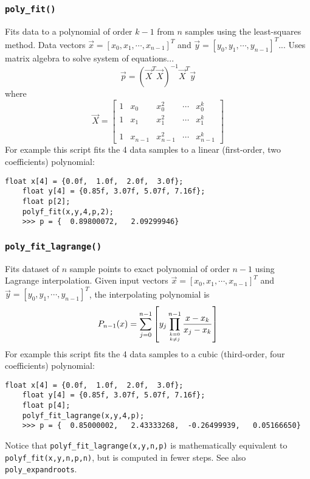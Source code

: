 \subsubsection{{\tt poly\_fit()}}
\label{module:math:poly:polyf_fit}
Fits data to a polynomial of order $k-1$ from $n$ samples using the
least-squares method.
Data vectors
$\vec{x}=[x_0,x_1,\cdots,x_{n-1}]^T$ and 
$\vec{y}=[y_0,y_1,\cdots,y_{n-1}]^T$...
Uses matrix algebra to solve system of equations...
%
\begin{equation}
\label{eqn:math:poly:syseq}
    \vec{p} = \left(\vec{X}^T\vec{X}\right)^{-1}\vec{X}^T\vec{y}
\end{equation}
%
where
%
\begin{equation}
\label{eqn:math:poly:polyfit}
    \vec{X} = 
    \begin{bmatrix}
        1   & x_0       & x_0^2     & \cdots    & x_0^{k}     \\
        1   & x_1       & x_1^2     & \cdots    & x_1^{k}     \\
        \\
        1   & x_{n-1}   & x_{n-1}^2 & \cdots    & x_{n-1}^{k}
    \end{bmatrix}
\end{equation}
%
For example this script fits the 4 data samples to a linear
(first-order, two coefficients) polynomial:
%
\begin{Verbatim}[fontsize=\small]
    float x[4] = {0.0f,  1.0f,  2.0f,  3.0f};
    float y[4] = {0.85f, 3.07f, 5.07f, 7.16f};
    float p[2];
    polyf_fit(x,y,4,p,2);
    >>> p = {  0.89800072,   2.09299946}
\end{Verbatim}


\subsubsection{{\tt poly\_fit\_lagrange()}}
\label{module:math:poly:polyf_fit_lagrange}
Fits dataset of $n$ sample points to exact polynomial of order $n-1$ using
Lagrange interpolation.
Given input vectors
$\vec{x}=[x_0,x_1,\cdots,x_{n-1}]^T$ and 
$\vec{y}=[y_0,y_1,\cdots,y_{n-1}]^T$, the interpolating polynomial is
%
\begin{equation}
\label{eqn:math:poly:polyfit_lagrange}
    P_{n-1}(x) =
        \sum_{j=0}^{n-1} {
            \left[
            y_j
            \prod_{{k=0}\atop{k \ne j}}^{n-1} {
                \frac{x-x_k}{x_j-x_k}
            }
            \right]
        }
\end{equation}
%
For example this script fits the 4 data samples to a cubic
(third-order, four coefficients) polynomial:
%
\begin{Verbatim}[fontsize=\small]
    float x[4] = {0.0f,  1.0f,  2.0f,  3.0f};
    float y[4] = {0.85f, 3.07f, 5.07f, 7.16f};
    float p[4];
    polyf_fit_lagrange(x,y,4,p);
    >>> p = {  0.85000002,   2.43333268,  -0.26499939,   0.05166650}
\end{Verbatim}
%
Notice that {\tt polyf\_fit\_lagrange(x,y,n,p)}
is mathematically equivalent to {\tt polyf\_fit(x,y,n,p,n)},
but is computed in fewer steps.
%
See also {\tt poly\_expandroots}.

